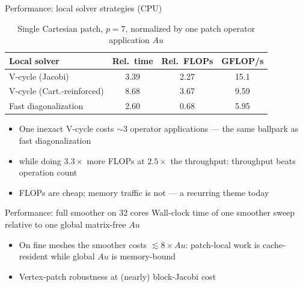 \documentclass{beamer}
\begin{document}
\begin{frame}{Performance: local solver strategies (CPU)}
    \begin{table}
        \centering
        \caption{Single Cartesian patch, $p=7$, normalized by one patch operator application $Au$}
        \small
        \begin{tabular}{lccc}
            \toprule
            \textbf{Local solver}      & \textbf{Rel.\ time} & \textbf{Rel.\ FLOPs} & \textbf{GFLOP/s} \\
            \midrule
            \alert{V-cycle (Jacobi)}   & \alert{3.39}        & 2.27                 & \alert{15.1}     \\
            V-cycle (Cart.-reinforced) & 8.68                & 3.67                 & 9.59             \\
            \midrule
            Fast diagonalization       & 2.60                & \alert{0.68}         & 5.95             \\
            \bottomrule
        \end{tabular}
    \end{table}
    \begin{itemize}
        \item One inexact V-cycle costs $\sim$3 operator applications --- \alert{the same ballpark as fast diagonalization}
        \item while doing \alert{$3.3\times$ more FLOPs} at \alert{$2.5\times$ the throughput}: throughput beats operation count
        \item FLOPs are cheap; memory traffic is not --- a recurring theme today
    \end{itemize}
\end{frame}

\begin{frame}{Performance: full smoother on 32 cores}
    \footnotesize{
        \centering
        Wall-clock time of one smoother sweep relative to one global matrix-free $Au$
    }
    \par
    \normalsize
    \begin{center}
        \resizebox{0.9\textwidth}{!}{}
    \end{center}
    \vspace{-0.5em}
    \begin{itemize}
        \small
        \item On fine meshes the smoother costs $\lesssim 8\times Au$: patch-local work is cache-resident while global $Au$ is
              memory-bound
        \item Vertex-patch robustness at (nearly) block-Jacobi cost
    \end{itemize}
\end{frame}
\end{document}

